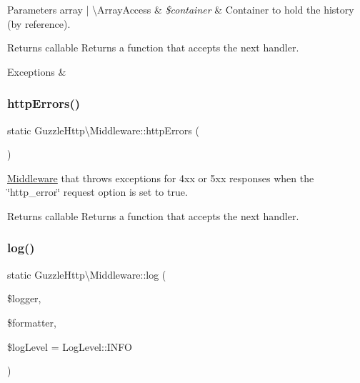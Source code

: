 \begin{DoxyParams}[1]{Parameters}
array | \textbackslash{}\+Array\+Access & {\em \$container} & Container to hold the history (by reference).\\
\hline
\end{DoxyParams}
\begin{DoxyReturn}{Returns}
callable Returns a function that accepts the next handler. 
\end{DoxyReturn}

\begin{DoxyExceptions}{Exceptions}
{\em } & \\
\hline
\end{DoxyExceptions}
\mbox{\label{classGuzzleHttp_1_1Middleware_a5c98a3a7d767bc21143079f727c42a84}} 
\subsubsection{\texorpdfstring{http\+Errors()}{httpErrors()}}
{\footnotesize\ttfamily static Guzzle\+Http\textbackslash{}\+Middleware\+::http\+Errors (\begin{DoxyParamCaption}{ }\end{DoxyParamCaption})\hspace{0.3cm}{\ttfamily [static]}}

\hyperlink{classGuzzleHttp_1_1Middleware}{Middleware} that throws exceptions for 4xx or 5xx responses when the \char`\"{}http\+\_\+error\char`\"{} request option is set to true.

\begin{DoxyReturn}{Returns}
callable Returns a function that accepts the next handler. 
\end{DoxyReturn}
\mbox{\label{classGuzzleHttp_1_1Middleware_a90393ebcd93ae23f2a41747ff1cb4fd5}} 
\subsubsection{\texorpdfstring{log()}{log()}}
{\footnotesize\ttfamily static Guzzle\+Http\textbackslash{}\+Middleware\+::log (\begin{DoxyParamCaption}\item[{Logger\+Interface}]{\$logger,  }\item[{\hyperlink{classGuzzleHttp_1_1MessageFormatter}{Message\+Formatter}}]{\$formatter,  }\item[{}]{\$log\+Level = {\ttfamily LogLevel\+:\+:INFO} }\end{DoxyParamCaption})\hspace{0.3cm}{\ttfamily [static]}}

